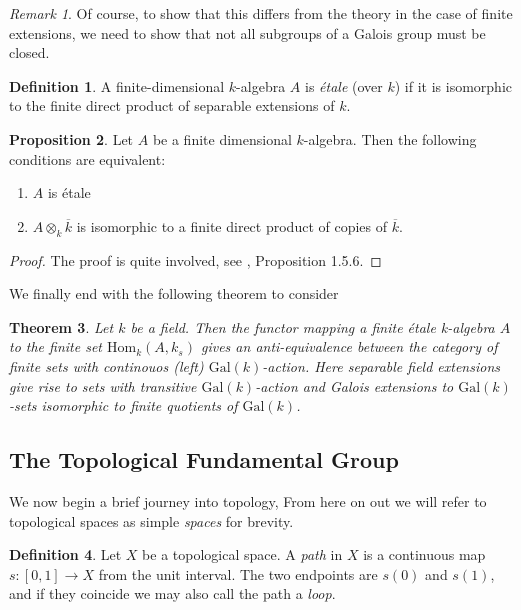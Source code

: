 \documentclass{article}
\newtheorem{theorem}{Theorem}[section]
\theoremstyle{definition}
\newtheorem{proposition}[theorem]{Proposition}
\newtheorem{definition}[theorem]{Definition}
\theoremstyle{remark}
\newtheorem*{remark}{Remark}
\begin{document}
\begin{remark}
	Of course, to show that this differs from the theory in the case of finite extensions, we need to show that not all subgroups of a Galois group must be closed.
\end{remark}

\begin{definition}
	A finite-dimensional $k$-algebra $A$ is \textit{\'etale} (over $k$) if it is isomorphic to the finite direct product of separable extensions of $k$.
\end{definition}

\begin{proposition}
	Let $A$ be a finite dimensional $k$-algebra.
	Then the following conditions are equivalent:
	\begin{enumerate}
		\item $A$ is \'etale
		\item $A \otimes_k \overline{k}$ is isomorphic to a finite direct product of copies of $\overline{k}$.
	\end{enumerate}
\end{proposition}
\begin{proof}
	The proof is quite involved, see \cite{Szamuely}, Proposition 1.5.6.
\end{proof}

We finally end with the following theorem to consider 
\begin{theorem}
	Let $k$ be a field. 
	Then the functor mapping a finite \'etale k-algebra $A$ to the finite set $\text{Hom}_k(A, k_s)$ gives an anti-equivalence between the category of finite sets with continouos (left) $\text{Gal}(k)$-action.
	Here separable field extensions give rise to sets with transitive $\text{Gal}(k)$-action and Galois extensions to $\text{Gal}(k)$ -sets isomorphic to finite quotients of $\text{Gal}(k)$.
\end{theorem}


\subsection{The Topological Fundamental Group}

We now begin a brief journey into topology,
From here on out we will refer to topological spaces as simple \textit{spaces} for brevity.

\begin{definition}
	Let $X$ be a topological space. 
	A \textit{path} in $X$ is a continuous map $s: [0,1] \to X$ from the unit interval.
	The two endpoints are $s(0)$ and $s(1)$, and if they coincide we may also call the path a \textit{loop}.
\end{definition}
\end{document}
